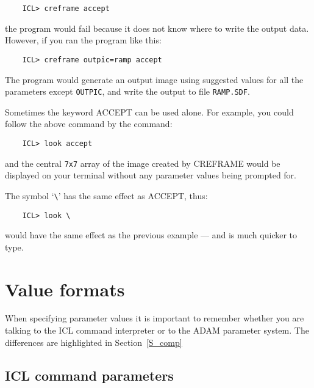 \begin{small}
\begin{verbatim}
    ICL> creframe accept
\end{verbatim}
\end{small}

the program would fail because it does not know where to write the output
data.
However, if you ran the program like this:

\begin{small}
\begin{verbatim}
    ICL> creframe outpic=ramp accept
\end{verbatim}
\end{small}

The program would generate an output image using suggested values for all the
parameters except {\small\tt OUTPIC}, and write the output to file
{\small\tt RAMP.SDF}.

Sometimes the keyword ACCEPT can be used alone.
For example, you could follow the above command by the command:

\begin{small}
\begin{verbatim}
    ICL> look accept
\end{verbatim}
\end{small}

and the central {\tt 7x7} array of the image created by CREFRAME would be
displayed on your terminal without any parameter values being prompted for.

The symbol `\verb+\+' has the same effect as ACCEPT, thus:

\begin{small}
\begin{verbatim}
    ICL> look \
\end{verbatim}
\end{small}

would have the same effect as the previous example --- and is much quicker
to type.

\section{Value formats}
\label{S_sv}

When specifying parameter values it is important to remember whether you are
talking to the ICL command interpreter or to the ADAM parameter system.
The differences are highlighted in Section~\ref{S_comp}

\subsection{ICL command parameters}

